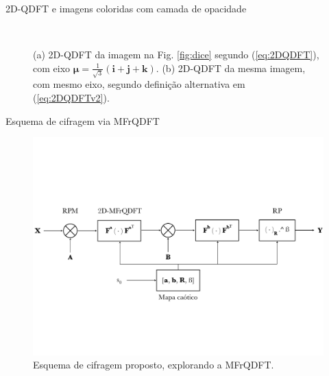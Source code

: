 \documentclass[10pt,compress]{beamer}
\newcommand{\qi}{\boldsymbol{i}}
\newcommand{\qj}{\boldsymbol{j}}
\newcommand{\qk}{\boldsymbol{k}}
\newcommand{\qmu}{\boldsymbol{\mu}}
\begin{document}
\begin{frame}{2D-QDFT e imagens coloridas com camada de opacidade}
\begin{figure}
	\centering
	~
	\caption{(a) 2D-QDFT da imagem na Fig. \ref{fig:dice} segundo (\ref{eq:2DQDFT}), com eixo $ \qmu = \frac{1}{\sqrt{3}}(\qi + \qj + \qk) $. (b) 2D-QDFT da mesma imagem, com mesmo eixo, segundo defini\c c\~ao alternativa em (\ref{eq:2DQDFTv2}).}
	\label{fig:QDFT}
\end{figure}
\end{frame}

\begin{frame}{Esquema de cifragem via MFrQDFT}
\begin{figure}
	\centering
	\includegraphics[width=0.99\linewidth]{Figures/esquema_PT.pdf}
	\caption{Esquema de cifragem proposto, explorando a MFrQDFT.}
	\label{fig:cifragem}
\end{figure}
\end{frame}
 
\end{document}
